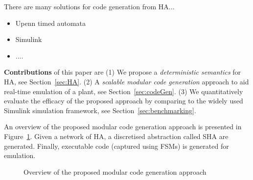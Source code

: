 There are many solutions for code generation from \acf{HA}...
\begin{itemize}
	\item Upenn timed automata
	\item Simulink
	\item ....
\end{itemize}
 
 \textbf{Contributions} of this paper are 
 (1) We propose a \emph{deterministic semantics} for \acf{HA}, see Section~\ref{sec:HA}.
 (2) A \emph{scalable modular code generation} approach 
 to aid real-time emulation of a plant, see Section~\ref{sec:codeGen}.
  (3) We quantitatively evaluate the efficacy of the 
  proposed approach by comparing  
   to the widely used Simulink\textsuperscript{\textregistered}
   simulation framework, see Section~\ref{sec:benchmarking}.
   
 An overview of the proposed modular code generation approach is presented
 in Figure~\ref{fig:overview}. Given a network
 of \ac{HA}, a discretised abstraction called \ac{SHA} are generated.
 Finally, executable code (captured using FSMs)  is generated for emulation.
 
 \begin{figure}[bthp]
 	\centering
 	\scalebox{0.7}{
	 
	}
	 \caption{Overview of the proposed modular 
	 	code generation approach \label{fig:overview}}
\end{figure}
      
 
 
